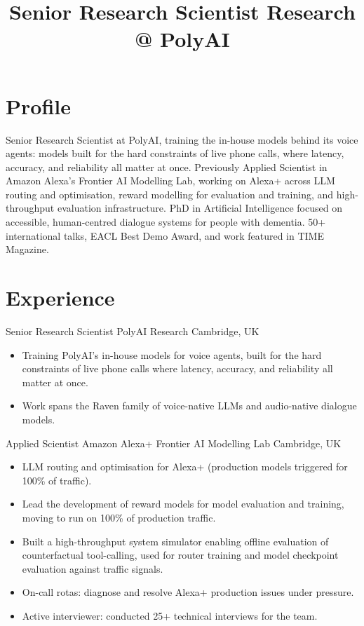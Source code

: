 \documentclass[11pt,a4paper,sans]{moderncv}
\title{Senior Research Scientist \textperiodcentered{} Research @ PolyAI}
\begin{document}
\makecvtitle

\section{Profile}
Senior Research Scientist at PolyAI, training the in-house models behind its
voice agents: models built for the hard constraints of live phone calls, where
latency, accuracy, and reliability all matter at once. Previously Applied
Scientist in Amazon Alexa's Frontier AI Modelling Lab, working on Alexa+ across
LLM routing and optimisation, reward modelling for evaluation and training, and
high-throughput evaluation infrastructure. PhD in Artificial Intelligence focused on accessible,
human-centred dialogue systems for people with dementia. 50+ international
talks, EACL Best Demo Award, and work featured in TIME Magazine.

\section{Experience}

{Senior Research Scientist}
{PolyAI \textbullet{} Research}
{Cambridge, UK}{}
{\begin{itemize}
\item Training PolyAI's in-house models for voice agents, built for the hard constraints of live phone calls where latency, accuracy, and reliability all matter at once.
\item Work spans the Raven family of voice-native LLMs and audio-native dialogue models.
\end{itemize}}

{Applied Scientist}
{Amazon Alexa+ \textbullet{} Frontier AI Modelling Lab}
{Cambridge, UK}{}
{\begin{itemize}
\item LLM routing and optimisation for Alexa+ (production models triggered for 100\% of traffic).
\item Lead the development of reward models for model evaluation and training, moving to run on 100\% of production traffic.
\item Built a high-throughput system simulator enabling offline evaluation of counterfactual tool-calling, used for router training and model checkpoint evaluation against traffic signals.
\item On-call rotas: diagnose and resolve Alexa+ production issues under pressure.
\item Active interviewer: conducted 25+ technical interviews for the team.
\end{itemize}}
\end{document}
